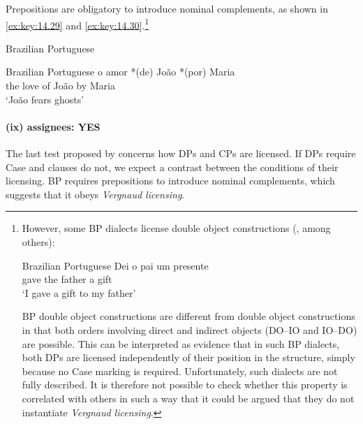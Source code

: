 \documentclass[output=paper]{langsci/langscibook}
\begin{document}
Prepositions are obligatory to introduce nominal complements, as shown in
\eqref{ex:key:14.29} and \eqref{ex:key:14.30}.\footnote{However, some \gls{BP}
    dialects license double object constructions
    (\citealt{Scher1996,LucchesiMello2009}, among others):

\begin{exe}
    Brazilian Portuguese
    \sn
    \gll    Dei o pai um presente\\
            gave the father a gift\\
    \glt    ‘I gave a gift to my father’
\end{exe}

\gls{BP} double object constructions are different from  double object
constructions in that both orders involving direct and indirect objects
(\gls{DO}--\gls{IO} and \gls{IO}--\gls{DO}) are
possible. This can be interpreted as evidence that in such \gls{BP} dialects,
both DPs are licensed independently of their position in the structure, simply
because no Case marking is required.  Unfortunately, such dialects are not
fully described. It is therefore not possible to check whether this property is
correlated with others in such a way that it could be argued that they do not
instantiate \emph{Vergnaud licensing}.}\newpage

\ea\label{ex:key:14.29}Brazilian Portuguese
\z

\ea\label{ex:key:14.30}Brazilian Portuguese
    \sn
    \gll    o amor *(de) João *(por) Maria\\
            the love \hphantom{*(}of João \hphantom{*(}by Maria\\
    \glt    \enquote*{João fears ghosts}
\z

\paragraph*{(ix) assignees: YES}

The last test proposed by \citeauthor{SheevanderWal2018} concerns how DPs and
CPs are licensed. If DPs require Case and clauses do not, we expect a contrast
between the conditions of their licensing. \gls{BP} requires prepositions to
introduce nominal complements, which suggests that it obeys \emph{Vergnaud
licensing}.
\end{document}
